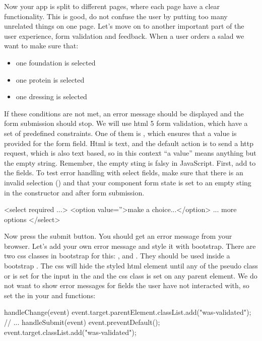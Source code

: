 \documentclass[fleqn, article, a4paper]{memoir}
\begin{document}
\begin{Assignments}
\item Now your app is split to different pages, where each page have a clear functionality. This is good, do not confuse the user by putting too many unrelated things on one page. Let's move on to another important part of the user experience, form validation and feedback. When a user orders a salad we want to make sure that:
\begin{itemize}
  \item one foundation is selected
  \item one protein is selected
  \item one dressing is selected
\end{itemize}
If these conditions are not met, an error message should be displayed and the form submission should stop. We will use html 5 form validation, which have a set of predefined constraints. One of them is , which ensures that a value is provided for the form field. Html is text, and the default action is to send a http request, which is also text based, so in this context ``a value'' means anything but the empty string. Remember, the empty sting is falsy in JavaScript. First, add  to the  fields. To test error handling with select fields, make sure that there is an invalid selection () and that your component form state is set to an empty sting in the constructor and after form submission.
\begin{Code}
<select required ...>
  <option value=''>make a choice...</option>
  ... more options
</select>
\end{Code}
Now press the submit button. You should get an error message from your browser. Let's add your own error message and style it with bootstrap. There are two css classes in bootstrap for this: , and . They should be used inside a bootstrap . The css will hide the styled html element until any of the pseudo class  or  is set for the input in the  and the css class  is set on any parent element. We do not want to show error messages for fields the user have not interacted with, so set the  in your  and  functions:
\begin{Code}
handleChange(event) {
  event.target.parentElement.classList.add("was-validated");
  // ...
}
handleSubmit(event){
  event.preventDefault();
  event.target.classList.add("was-validated");
}
\end{Code}
\end{Assignments}
\end{document}
